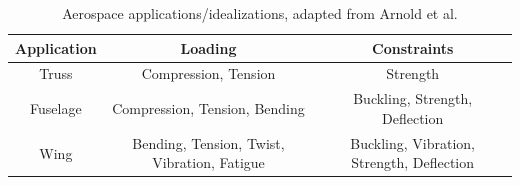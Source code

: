 \begin{table}[H]
\centering
\caption{Aerospace applications/idealizations, adapted from Arnold et al. \cite[p. 6] {Arnold2012MaterialsSelection}}
\begin{tabular}{|c|c|c|}
\hline
\textbf{Application} & \textbf{Loading} & \textbf{Constraints} \\ \hline\hline

Truss & Compression, Tension & Strength \\ \hline

Fuselage  & Compression, Tension, Bending  & Buckling, Strength, Deflection \\ \hline







Wing & Bending, Tension, Twist, Vibration, Fatigue & Buckling, Vibration, Strength, Deflection \\ \hline


\end{tabular}
\label{tab:aerospace_applications}
\end{table}
